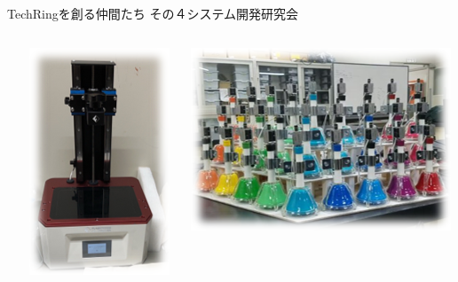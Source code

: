 \documentclass[dvipdfmx]{beamer}
\begin{document}
\begin{frame}{TechRingを創る仲間たち その４}{システム開発研究会}
\begin{footnotesize}
\begin{columns}
\begin{column}{.18\textwidth}
\begin{flushleft}
        \end{flushleft}
      \end{column}
      \begin{column}{.18\textwidth}
        \includegraphics[scale=0.5]{pic/shisuken4.png}
      \end{column}
      \hspace{-1mm}
      \begin{column}{.18\textwidth}
       \begin{flushleft}
         \includegraphics[scale=0.4]{pic/shisuken5.png}
       \end{flushleft}
      \end{column}
    \end{columns}
  \end{footnotesize}


\end{frame}
\end{document}
